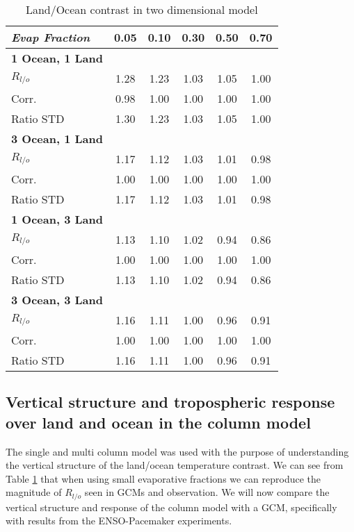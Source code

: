 \begin{center}
	\begin{table}[ht]
		\caption{Land/Ocean contrast in two dimensional model}
		\label{tab:tdm_Rlo}
		\scriptsize
	\begin{tabular}{ l  c  c  c  c  c }
		\hline
		\textit{Evap Fraction}	& 0.05  & 0.10 & 0.30  & 0.50  & 0.70 \\ \hline
		\textbf{1 Ocean, 1 Land}\\
		$R_{l/o}$ 					& 1.28  & 1.23 & 1.03  & 1.05 & 1.00\\ 
		Corr.					& 0.98  & 1.00 & 1.00  & 1.00 & 1.00\\ %
		Ratio STD          		& 1.30  & 1.23 & 1.03  & 1.05 & 1.00\\ \hline
		\textbf{3 Ocean, 1 Land}\\
		$R_{l/o}$ 					& 1.17  & 1.12 & 1.03  & 1.01 & 0.98\\ %
		Corr.					& 1.00  & 1.00 & 1.00  & 1.00 & 1.00\\ %
		Ratio STD          		& 1.17  & 1.12 & 1.03  & 1.01 & 0.98\\ \hline
		\textbf{1 Ocean, 3 Land}\\
		$R_{l/o}$ 					& 1.13  & 1.10 & 1.02  & 0.94 & 0.86\\ %
		Corr.					& 1.00  & 1.00 & 1.00  & 1.00 & 1.00\\ %
		Ratio STD          		& 1.13  & 1.10 & 1.02  & 0.94 & 0.86\\ \hline
		\textbf{3 Ocean, 3 Land}\\
		$R_{l/o}$ 					& 1.16  & 1.11 & 1.00  & 0.96 & 0.91\\ %
		Corr.					& 1.00  & 1.00 & 1.00  & 1.00 & 1.00\\ %
		Ratio STD          		& 1.16  & 1.11 & 1.00  & 0.96 & 0.91\\ \hline
	\end{tabular}
	\end{table}
\end{center}

\subsection{Vertical structure and tropospheric response over land and ocean in 
the column model}
\label{sec:mcm_linreg_plev}

The single and multi column model was used with the purpose of understanding the 
vertical structure of the land/ocean temperature contrast. We can see from Table 
\ref{tab:tdm_Rlo} that when using small evaporative fractions we can reproduce 
the magnitude of $R_{l/o}$ seen in GCMs and observation. We will now compare the 
vertical structure and response of the column model with a GCM, specifically 
with results from the ENSO-Pacemaker experiments.  

